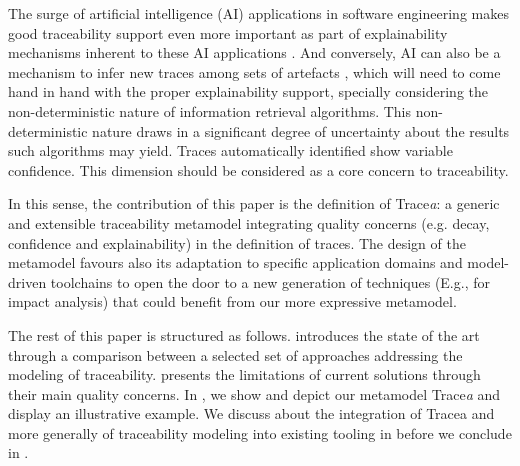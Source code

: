 
The surge of artificial intelligence (AI) applications in software engineering makes good traceability support even more important as part of explainability mechanisms inherent to these AI applications \cite{ozkaya2020-differences-in-AI-enabled-engineering,Mikkonen2021}. And conversely, AI can also be a mechanism to infer new traces among sets of artefacts  \cite{borg2014-SmS-IR-for-traceability,guo2017-semantically-enhanced-tracebility-deep-learning}, which will need to come hand in hand with the proper explainability support, specially considering the non-deterministic nature of information retrieval algorithms. This non-deterministic nature draws in a significant degree of uncertainty about the results such algorithms may yield. Traces automatically identified show variable confidence. This dimension should be considered as a core concern to traceability.

In this sense, the contribution of this paper is the definition of Trace\textit{a}: a generic and extensible traceability metamodel integrating quality concerns (e.g. decay, confidence and explainability) in the definition of traces. The design of the metamodel favours also its adaptation to specific application domains and model-driven toolchains to open the door to a new generation of techniques (E.g., for impact analysis) that could benefit from our more expressive metamodel.


The rest of this paper is structured as follows.  introduces the state of the art through a comparison between a selected set of approaches addressing the modeling of traceability.
 presents the limitations of current solutions through their main quality concerns. In , we show and depict our metamodel Trace\textit{a} and display an illustrative example. We discuss about the integration of Tracea and more generally of traceability modeling into existing tooling in  before we conclude in .






